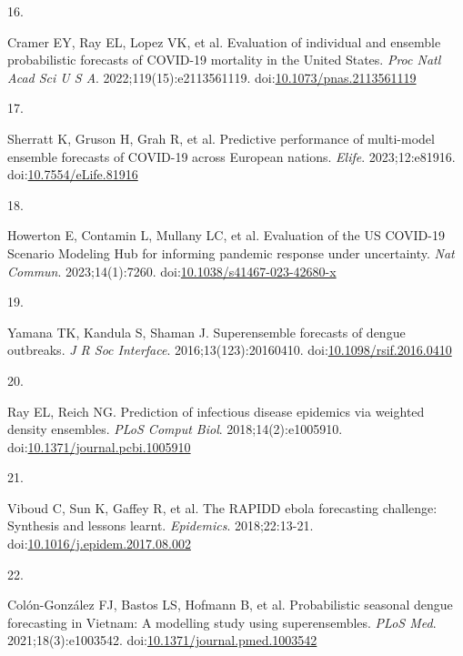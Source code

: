 \documentclass[
]{article}
\newlength{\cslhangindent}
\newlength{\csllabelwidth}
\newenvironment{CSLReferences}[2] %
 {\begin{list}{}{%
  \setlength{\itemindent}{0pt}
  \setlength{\leftmargin}{0pt}
  \setlength{\parsep}{0pt}
  \ifodd #1
   \setlength{\leftmargin}{\cslhangindent}
   \setlength{\itemindent}{-1\cslhangindent}
  \fi
  \setlength{\itemsep}{#2\baselineskip}}}
 {\end{list}}
\newcommand{\CSLLeftMargin}[1]{\parbox[t]{\csllabelwidth}{\strut#1\strut}}
\newcommand{\CSLRightInline}[1]{\parbox[t]{\linewidth - \csllabelwidth}{\strut#1\strut}}
\begin{document}
\begin{CSLReferences}{0}{1}
\CSLLeftMargin{16. }%
\CSLRightInline{Cramer EY, Ray EL, Lopez VK, et al. Evaluation of
individual and ensemble probabilistic forecasts of COVID-19 mortality in
the {United States}. \emph{Proc Natl Acad Sci U S A}.
2022;119(15):e2113561119.
doi:\href{https://doi.org/10.1073/pnas.2113561119}{10.1073/pnas.2113561119}}

\CSLLeftMargin{17. }%
\CSLRightInline{Sherratt K, Gruson H, Grah R, et al. Predictive
performance of multi-model ensemble forecasts of {COVID}-19 across
{European} nations. \emph{Elife}. 2023;12:e81916.
doi:\href{https://doi.org/10.7554/eLife.81916}{10.7554/eLife.81916}}

\CSLLeftMargin{18. }%
\CSLRightInline{Howerton E, Contamin L, Mullany LC, et al. Evaluation of
the {US} {COVID}-19 {Scenario} {Modeling} {Hub} for informing pandemic
response under uncertainty. \emph{Nat Commun}. 2023;14(1):7260.
doi:\href{https://doi.org/10.1038/s41467-023-42680-x}{10.1038/s41467-023-42680-x}}

\CSLLeftMargin{19. }%
\CSLRightInline{Yamana TK, Kandula S, Shaman J. Superensemble forecasts
of dengue outbreaks. \emph{J R Soc Interface}. 2016;13(123):20160410.
doi:\href{https://doi.org/10.1098/rsif.2016.0410}{10.1098/rsif.2016.0410}}

\CSLLeftMargin{20. }%
\CSLRightInline{Ray EL, Reich NG. Prediction of infectious disease
epidemics via weighted density ensembles. \emph{PLoS Comput Biol}.
2018;14(2):e1005910.
doi:\href{https://doi.org/10.1371/journal.pcbi.1005910}{10.1371/journal.pcbi.1005910}}

\CSLLeftMargin{21. }%
\CSLRightInline{Viboud C, Sun K, Gaffey R, et al. The RAPIDD ebola
forecasting challenge: Synthesis and lessons learnt. \emph{Epidemics}.
2018;22:13-21.
doi:\href{https://doi.org/10.1016/j.epidem.2017.08.002}{10.1016/j.epidem.2017.08.002}}

\CSLLeftMargin{22. }%
\CSLRightInline{Colón-González FJ, Bastos LS, Hofmann B, et al.
Probabilistic seasonal dengue forecasting in {Vietnam}: {A} modelling
study using superensembles. \emph{PLoS Med}. 2021;18(3):e1003542.
doi:\href{https://doi.org/10.1371/journal.pmed.1003542}{10.1371/journal.pmed.1003542}}


\end{CSLReferences}
\end{document}
